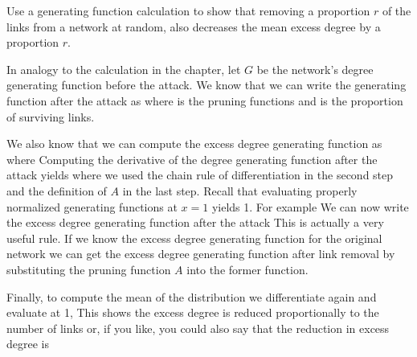 
\label{exAttackExcessReduce}Use a generating function calculation to show that removing a proportion $r$ of the links from a network at random, also decreases the mean excess degree by a proportion $r$. 

\solution
In analogy to the calculation in the chapter, let $G$ be the network's degree generating function before the attack. We know that we can write the generating function after the attack as 
where 
is the pruning functions and
is the proportion of surviving links. 

We also know that we can compute the excess degree generating function as 
where 
Computing the derivative of the degree generating function after the attack yields  
where we used the chain rule of differentiation in the second step and the definition of $A$ in the last step. Recall that evaluating properly normalized generating functions at $x=1$ yields 1. For example 
We can now write the excess degree generating function after the attack
This is actually a very useful rule. If we know the excess degree generating function for the original network we can get the excess degree generating function after link removal by substituting the pruning function $A$ into the former function.  

Finally, to compute the mean of the distribution we differentiate again and evaluate at 1,
This shows the excess degree is reduced proportionally to the number of links or, if you like, you could also say that the reduction in excess degree is 

